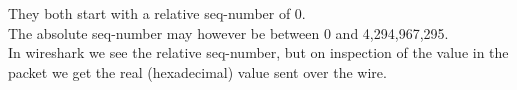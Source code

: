 They both start with a relative seq-number of 0.\\
The absolute seq-number may however be between 0 and 4,294,967,295.\\
In wireshark we see the relative seq-number, but on inspection of the value in the packet we get the real (hexadecimal) value sent over the wire.